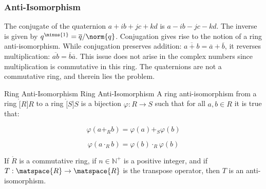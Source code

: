 \documentclass{article}                                                        %
\begin{document}
            \subsubsection{Anti-Isomorphism}
                The conjugate of the quaternion $a+ib+jc+kd$ is $a-ib-jc-kd$.
                The inverse is given by $q^{\minus{1}}=\overline{q}/\norm{q}$.
                Conjugation gives rise to the notion of a ring anti-isomorphism.
                While conjugation preserves addition:
                $\overline{a+b}=\overline{a}+\overline{b}$, it reverses
                multiplication: $\overline{ab}=\overline{b}\overline{a}$. This
                issue does not arise in the complex numbers since multiplication
                is commutative in this ring. The quaternions are not a
                commutative ring, and therein lies the problem.
                \begin{fdefinition}{Ring Anti-Isomorphism}
                                   {Ring Anti-Isomorphism}
                    A ring anti-isomorphism from a ring $\ring[R]{R}$ to a ring
                    $\ring[S]{S}$ is a bijection $\varphi:R\rightarrow{S}$ such
                    that for all $a,b\in{R}$ it is true that:
                    \par
                    \begin{minipage}[b]{0.49\textwidth}
                        \centering
                        \begin{equation*}
                            \varphi(a+_{R}b)=\varphi(a)+_{S}\varphi(b)
                        \end{equation*}
                    \end{minipage}
                    \hfill
                    \begin{minipage}[b]{0.49\textwidth}
                        \centering
                        \begin{equation*}
                            \varphi(a\cdot_{R}b)=\varphi(b)\cdot_{R}\varphi(b)
                        \end{equation*}
                    \end{minipage}
                \end{fdefinition}
                \begin{theorem}
                    If $\ring{R}$ is a commutative ring, if $n\in\mathbb{N}^{+}$
                    is a positive integer, and if
                    $T:\matspace{R}\rightarrow\matspace{R}$ is the transpose
                    operator, then $T$ is an anti-isomorphism.
                \end{theorem}
\end{document}
